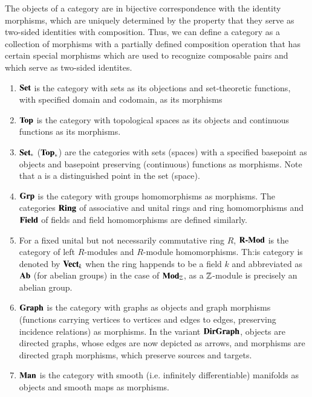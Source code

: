 \documentclass[12pt, a4paper, oneside, openright, titlepage]{book}
\begin{document}
\begin{rmk}
    The objects of a category are in bijective correspondence with the identity morphisms, which are uniquely determined by the property that they serve as two-sided identities with composition. Thus, we can define a category as a collection of morphisms with a partially defined composition operation that has certain special morphisms which are used to recognize composable pairs and which serve as two-sided identites. 
\end{rmk}


\begin{eg}
    \leavevmode
    \begin{enumerate}
        \item $\normalfont\textbf{Set}$ is the category with sets as its objections and set-theoretic functions, with specified domain and codomain, as its morphisms
        \item $\normalfont\textbf{Top}$ is the category with topological spaces as its objects and continuous functions as its morphisms.
        \item $\normalfont\textbf{Set}_*$ ($\normalfont\textbf{Top}_*$) are the categories with sets (spaces) with a specified basepoint as objects and basepoint preserving (continuous) functions as morphisms. Note that a  is a distinguished point in the set (space).
        \item $\normalfont\textbf{Grp}$ is the category with groups homomorphisms as morphisms. The categories $\normalfont\textbf{Ring}$ of associative and unital rings and ring homomorphisms and $\normalfont\textbf{Field}$ of fields and field homomorphisms are defined similarly.
        \item For a fixed unital but not necessarily commutative ring $R$, $\normalfont\textbf{R-Mod}$ is the category of left $R$-modules and $R$-module homomorphisms. Th:is category is denoted by $\normalfont\textbf{Vect}_{k}$ when the ring happends to be a field $k$ and abbreviated as $\normalfont\textbf{Ab}$ (for abelian groups) in the case of $\normalfont\textbf{Mod}_{\mathbb Z}$, as a $\mathbb Z$-module is precisely an abelian group.
        \item $\normalfont\textbf{Graph}$ is the category with graphs as objects and graph morphisms (functions carrying vertices to vertices and edges to edges, preserving incidence relations) as morphisms. In the variant $\normalfont\textbf{DirGraph}$, objects are directed graphs, whose edges are now depicted as arrows, and morphisms are directed graph morphisms, which preserve sources and targets.
        \item $\normalfont\textbf{Man}$ is the category with smooth (i.e. infinitely differentiable) manifolds as objects and smooth maps as morphisms.

\end{enumerate}
\end{eg}
\end{document}
